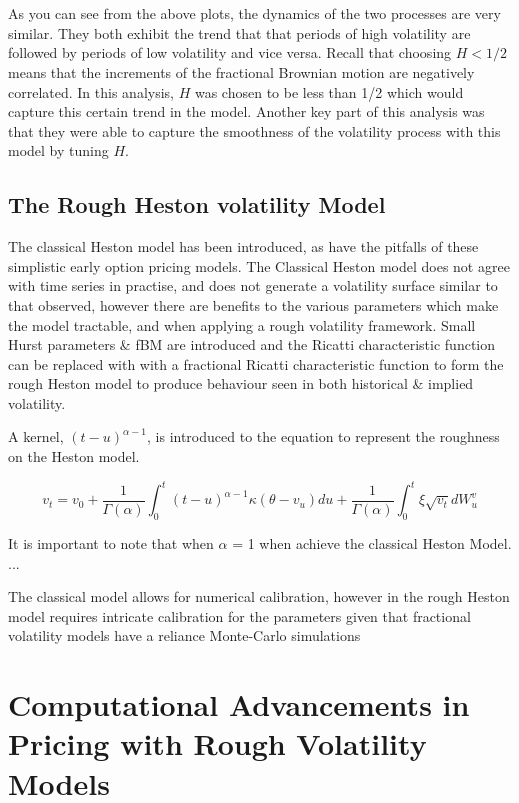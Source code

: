 \documentclass[12pt,oneside]{article}
\begin{document}
\\
\\
As you can see from the above plots, the dynamics of the two processes are very similar. They both exhibit the trend that that periods of high volatility are followed by periods of low volatility and vice versa. Recall that choosing $H<1/2$ means that the increments of the fractional Brownian motion are negatively correlated. In this analysis, $H$ was chosen to be less than 1/2 which would capture this certain trend in the model. Another key part of this analysis was that they were able to capture the smoothness of the volatility process with this model by tuning $H$. 

\subsection{The Rough Heston volatility Model}
\label{sebsec:rough_heston}
The classical Heston model has been introduced, as have the pitfalls  of these simplistic early option pricing models. The Classical Heston model does not agree with time series in practise, and does not generate a volatility surface similar to that observed, however there are benefits to the various parameters which make the model tractable, and when applying a rough volatility framework. Small Hurst parameters & fBM are introduced and the Ricatti characteristic function can be replaced with with a fractional Ricatti characteristic function to form the rough Heston model to produce behaviour seen in both historical & implied volatility.

A kernel, $(t-u)^{\alpha-1}$, is introduced to the equation to represent the roughness on the Heston model. 

$$v_t = v_0 + \frac{1}{\Gamma(\alpha)} \int_{0}^{t} (t-u)^{\alpha-1} \kappa (\theta - v_u)du + \frac{1}{\Gamma(\alpha)} \int_{0}^{t} \xi\sqrt{v_t}dW_u^{v}$$

It is important to note that when $\alpha$ = 1 when achieve the classical Heston Model. ...

The classical model allows for numerical calibration, however in the rough Heston model requires intricate calibration for the parameters given that fractional volatility models have a reliance Monte-Carlo simulations 

\section{Computational Advancements in Pricing with Rough Volatility Models}
\label{sec:comp_advamcement}
\end{document}
